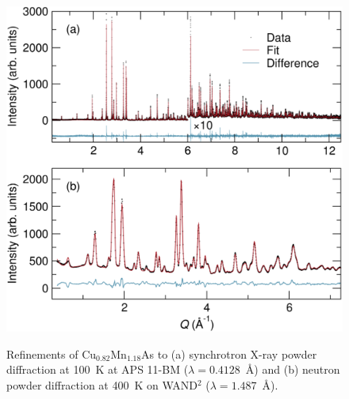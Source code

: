 \documentclass[10pt,doublespacing,edeposit]{uiucthesis2020}
\begin{document}
\begin{mainmatter}
\begin{figure}
\centering\includegraphics[width=0.7\columnwidth]{figures/ch5/h-cumnas_11bm_100k_wand_400k_combine} \\
\caption{
Refinements of Cu$_{0.82}$Mn$_{1.18}$As to (a) synchrotron X-ray powder diffraction at 100~K at APS 11-BM ($\lambda = 0.4128$~\AA) and (b) neutron powder diffraction at 400~K on WAND$^2$ ($\lambda = 1.487$~\AA).
}
\label{fig:xrd-neutron}
\end{figure}

\end{mainmatter}
\end{document}
